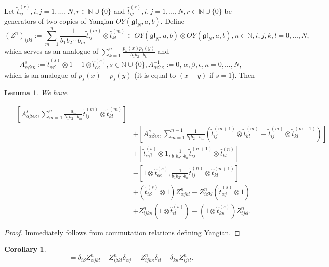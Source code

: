 \documentclass[10pt]{article}%
\numberwithin{equation}{section}
\newtheorem{cor}[thm]{Corollary}
\newtheorem{lem}[thm]{Lemma}
\newcommand{\gl}{{\mathfrak{gl}}}
\begin{document}
Let $\tilde{t}_{ij}^{(r)},i,j=1,\ldots, N, r\in \mathbb{N}\cup\{0\}$ and  $\hat{t}_{ij}^{(r)},i,j=1,\ldots, N, r\in \mathbb{N}\cup\{0\}$ be generators of two copies of Yangian $OY(\gl_N,a,b)$. Define 
\[
(Z^n)_{ijkl}:=\sum\limits_{m=1}^n\frac{1}{b_1b_2\cdots b_m}\tilde{t}_{ij}^{(m)}\otimes \hat{t}_{kl}^{(m)}\in OY(\gl_N,a,b)\otimes OY(\gl_N,a,b),n\in\mathbb{N},i,j,k,l=0,\ldots,N,
\]
which serves as an analogue of $\sum\limits_{k=1}^n\frac{p_k(x)p_k(y)}{b_1 b_2\cdots b_k}$ and
\[
A_{\alpha\beta\epsilon \kappa}^{s}:=\tilde{t}_{\alpha\beta}^{(s)}\otimes 1-1\otimes \hat{t}_{\epsilon \kappa}^{(s)},s\in \mathbb{N}\cup\{0\}, A_{\alpha\beta\epsilon \kappa}^{-1}:=0,\,\alpha,\beta,\epsilon,\kappa=0,\ldots,N,
\]
 which is an analogue of $p_s(x)-p_s(y)$ (it is equal to $(x-y)$ if $s=1$). Then 
\begin{lem}
    We have
    
    \begin{eqnarray}
        [A_{\alpha\beta\epsilon \kappa}^{s+1} &+ a_s A_{\alpha\beta\epsilon \kappa}^{s} + b_s A_{\alpha\beta\epsilon \kappa}^{s-1},Z^n_{ijkl} ] =[A_{\alpha\beta\epsilon \kappa}^{s},\sum\limits_{m=1}^n \frac{a_m}{b_1b_2\cdots b_m}\tilde{t}_{ij}^{(m)}\otimes \tilde{t}_{kl}^{(m)}]\nonumber\\
&+[A_{\alpha\beta\epsilon \kappa}^{s},\sum\limits_{m=1}^{n-1} \frac{1}{b_1b_2\cdots b_m}(\tilde{t}_{ij}^{(m+1)}\otimes \tilde{t}_{kl}^{(m)}+\tilde{t}_{ij}^{(m)}\otimes \tilde{t}_{kl}^{(m+1)})]
        \nonumber\\
        &+[\tilde{t}_{\alpha\beta}^{(s)}\otimes 1,\frac{1}{b_1b_2\cdots b_n}\tilde{t}_{ij}^{(n+1)}\otimes \hat{t}_{kl}^{(n)}]\nonumber\\
        &-[1\otimes \hat{t}_{\epsilon \kappa}^{(s)},\frac{1}{b_1b_2\cdots b_n}\tilde{t}_{ij}^{(n)}\otimes \hat{t}_{kl}^{(n+1)}]\nonumber\\
        &+(\tilde{t}_{i\beta}^{(s)}\otimes 1)Z^n_{\alpha jkl}- Z^n_{i\beta kl}(\tilde{t}_{\alpha j}^{(s)}\otimes 1)\nonumber\\
        &+Z^n_{ijk\kappa}(1\otimes \hat{t}_{\epsilon l}^{(s)})
        -(1\otimes \hat{t}_{k \kappa}^{(s)})Z^n_{ij\epsilon l}.\label{eqn:CristoffelDarbouxFormula}
    \end{eqnarray}
\end{lem}
\begin{proof}
    Immediately follows from commutation relations defining Yangian.
\end{proof}
\begin{cor}
    \begin{equation}
      [A_{\alpha\beta\epsilon \kappa}^{1},Z^n_{ijkl} ] =  \delta_{i\beta}Z^n_{\alpha jkl}- Z^n_{i\beta kl}\delta_{\alpha j}+Z^n_{ijk\kappa}\delta_{\epsilon l}
        -\delta_{k \kappa}Z^n_{ij\epsilon l}.
    \end{equation}
\end{cor}
\end{document}
